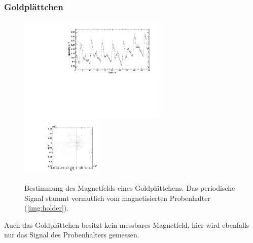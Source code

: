\subsubsection{Goldplättchen}
\begin{figure}[H]
\begin{center}
  \includegraphics[width=0.64\textwidth]{../img/Au-Plaettchen.pdf}
  \includegraphics[width=0.35\textwidth]{../img/polar_Au-Plaettchen.pdf}
  \caption{Bestimmung des Magnetfelds eines Goldplättchens. Das periodische Signal stammt vermutlich
  vom magnetisierten Probenhalter (\autoref{img:holder}).}
  \label{img:au}
\end{center}
\end{figure}

Auch das Goldplättchen besitzt kein messbares Magnetfeld,
hier wird ebenfalls nur das Signal des Probenhalters gemessen.

